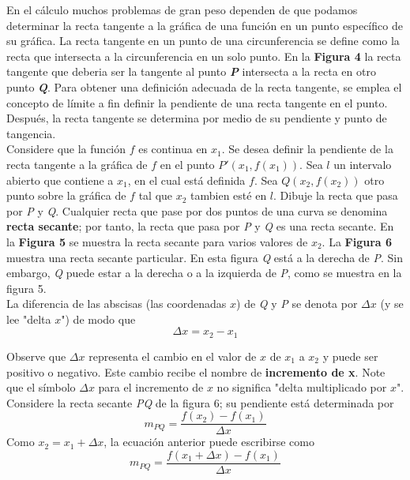 \documentclass[11pt]{report}
\begin{document}
\hspace*{10mm}En el cálculo muchos problemas de gran peso dependen de que podamos determinar la recta tangente a la gráfica de una función en un punto específico de su gráfica. La recta tangente en un punto de una circunferencia se define como la recta que intersecta a la circunferencia en un solo punto. En la \textbf{Figura 4} la recta tangente que deberia ser la tangente al punto \textbf{\textit{P}} intersecta a la recta en otro punto \textbf{\textit{Q}}. Para obtener una definición adecuada de la recta tangente, se emplea el concepto de límite a fin definir la pendiente de una recta tangente en el punto. Después, la recta tangente se determina por medio de su pendiente y punto de tangencia.\\
\hspace*{10mm}Considere que la función $f$ es continua en $x_1$. Se desea  definir la pendiente de la recta tangente a la gráfica de $f$ en el punto $P'(x_1,f(x_1))$. Sea $l$ un intervalo abierto que contiene a $x_1$, en el cual está definida $f$. Sea $Q(x_2,f(x_2))$ otro punto sobre la gráfica de $f$ tal que $x_2$ tambien esté en $l$. Dibuje la recta que pasa por \textit{P} y \textit{Q}. Cualquier recta que pase por dos puntos de una curva se denomina \textbf{recta secante}; por tanto, la recta que pasa por \textit{P} y \textit{Q} es una recta secante. En la \textbf{Figura 5}  se muestra la recta secante para varios valores de $x_2$. La \textbf{Figura 6} muestra una recta secante particular. En esta figura \textit{Q} está a la derecha de \textit{P}. Sin embargo, \textit{Q} puede estar a la derecha o a la izquierda de \textit{P}, como se muestra en la figura 5.\\
\hspace*{10mm}La diferencia de las abscisas (las coordenadas $x$) de \textit{Q} y \textit{P} se denota por $\Delta x$ (y se lee "delta $x$") de modo que
$$\Delta x=x_2-x_1$$

\hspace*{10mm}Observe que $\Delta x$ representa el cambio en el valor de $x$ de $x_1$ a $x_2$ y puede ser positivo o negativo. Este cambio recibe el nombre de \textbf{incremento de x}. Note que el símbolo $\Delta x$ para el incremento de $x$ no significa "delta multiplicado por $x$".\\
\hspace*{10mm}Considere la recta secante \textit{PQ} de la figura 6; su pendiente está determinada por
$$m_{PQ}=\frac{f(x_2)-f(x_1)}{\Delta x}$$
\hspace*{10mm}Como $x_2=x_1+\Delta x$, la ecuación anterior puede escribirse como
$$m_{PQ}=\frac{f(x_1+\Delta x)-f(x_1)}{\Delta x}$$
\end{document}
